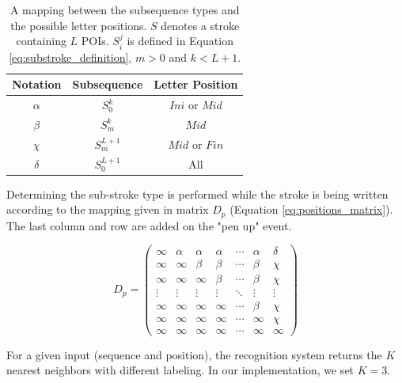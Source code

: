 \documentclass[10pt, conference, compsocconf]{IEEEtran}
\begin{document}
\begin{table}
\centering
\renewcommand{\arraystretch}{1.5}
\caption{A mapping between the subsequence types and the possible letter positions. $S$ denotes a stroke containing $L$ POIs. $S_i^j$ is defined in Equation \ref{eq:substroke_definition}, $m>0$ and $k<L+1$. }
\begin{tabular}{| c |c | c |}
\hline
  \textbf{Notation}  & \textbf{Subsequence}    & \textbf{Letter Position}  \\
\hline
  $\alpha$ & $S_0^{k}$         & $Ini$ or $Mid$  \\
\hline
  $\beta$  & $S_{m}^{k}$     & $Mid$              \\
\hline
  $\chi$    & $S_{m}^{L+1}$ & $Mid$ or $Fin$   \\
\hline
  $\delta$ & $S_0^{L+1}$     & All                   \\
\hline
\end{tabular}
\label{table:subsequences_types}
\vspace{-7pt}
\end{table}
Determining the sub-stroke type is performed while the stroke is being written according to the mapping given in matrix $D_p$ (Equation \ref{eq:positions_matrix}). 
The last column and row are added on the "pen up" event.

\begin{equation}
D_{p}=
\left( 
\begin{array}{ccccccc}
\infty 	& \alpha & \alpha & \alpha  & \cdots & \alpha & \delta \\
\infty  & \infty  & \beta   & \beta   & \cdots  & \beta  & \chi    \\
\infty  & \infty  & \infty   & \beta   & \cdots  & \beta  & \chi    \\
\vdots & \vdots & \vdots  & \vdots & \ddots  & \vdots & \vdots \\
\infty  & \infty  & \infty   & \infty   & \cdots  & \beta  & \chi    \\
\infty  & \infty  & \infty   & \infty   & \cdots  & \infty  & \chi    \\
\infty  & \infty  & \infty   & \infty   & \cdots  & \infty  & \infty \end{array} \right)
\label{eq:positions_matrix}
\end{equation}

For a given input (sequence and position), the recognition system returns the $K$ nearest neighbors with different labeling. In our implementation, we set $K=3$.
\end{document}

